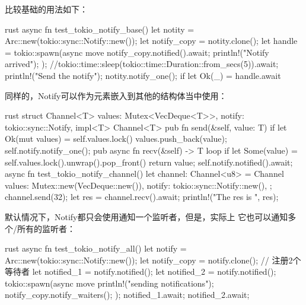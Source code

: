 比较基础的用法如下：
\begin{code-block}{rust}
async fn test_tokio_notify_base() {
    let notity = Arc::new(tokio::sync::Notify::new());
    let notify_copy = notity.clone();
    let handle = tokio::spawn(async move {
        notify_copy.notified().await;
        println!("Notify arrived");
    });
    //tokio::time::sleep(tokio::time::Duration::from_secs(5)).await;
    println!("Send the notify");
    notity.notify_one();
    if let Ok(_) = handle.await {}
}
\end{code-block}
同样的，Notify可以作为元素嵌入到其他的结构体当中使用：

\begin{code-block}{rust}
struct Channel<T> {
    values: Mutex<VecDeque<T>>,
    notify: tokio::sync::Notify,
}
impl<T> Channel<T> {
    pub fn send(&self, value: T) {
        if let Ok(mut values) = self.values.lock() {
            values.push_back(value);
            self.notify.notify_one();
        }
    }
    pub async fn recv(&self) -> T {
        loop {
            if let Some(value) = self.values.lock().unwrap().pop_front() {
                return value;
            }
            self.notify.notified().await;
        }
    }
}
async fn test_tokio_notify_channel() {
    let channel: Channel<u8> = Channel {
        values: Mutex::new(VecDeque::new()),
        notify: tokio::sync::Notify::new(),
    };
    channel.send(32);
    let res = channel.recv().await;
    println!("The res is {}", res);
}
\end{code-block}

默认情况下，Notify都只会使用通知一个监听者，但是，实际上
它也可以通知多个/所有的监听者：
\begin{code-block}{rust}
async fn test_tokio_notify_all() {
    let notify = Arc::new(tokio::sync::Notify::new());
    let notify_copy = notify.clone();
    // 注册2个等待者
    let notified_1 = notify.notified();
    let notified_2 = notify.notified();
    tokio::spawn(async move {
        println!("sending notifications");
        notify_copy.notify_waiters();
    });
    notified_1.await;
    notified_2.await;
}
\end{code-block}

